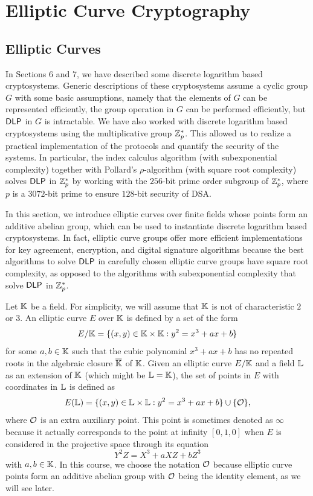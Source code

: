 \section{Elliptic Curve Cryptography}

\subsection{Elliptic Curves}
In Sections 6 and 7, we have described some discrete logarithm based cryptosystems.
Generic descriptions of these cryptosystems assume a cyclic group $G$ with some 
basic assumptions, namely that the elements of $G$ can be represented efficiently,
the group operation in $G$ can be performed efficiently, but ${\sf DLP}$ in $G$ is 
intractable. We have also worked with discrete logarithm based cryptosystems 
using the multiplicative group $\mathbb{Z}_p^*$. This allowed us to realize a 
practical implementation of the protocols and quantify the security of the 
systems. In particular, the index calculus algorithm (with subexponential
complexity) together with Pollard's $\rho$-algorithm (with square root 
complexity) solves ${\sf DLP}$ in $\mathbb{Z}_p^*$ by working with the $256$-bit prime 
order subgroup of $\mathbb{Z}_p^*$, where $p$ is a $3072$-bit prime to ensure 
$128$-bit security of DSA. 

In this section, we introduce elliptic curves over finite fields whose points 
form an additive abelian group, which can be used to instantiate discrete 
logarithm based cryptosystems. In fact, elliptic curve groups offer more 
efficient implementations for key agreement, encryption, and digital signature 
algorithms because the best algorithms to solve ${\sf DLP}$ in carefully chosen 
elliptic curve groups have square root complexity, as opposed to the algorithms 
with subexponential complexity that solve ${\sf DLP}$ in $\mathbb{Z}_p^*$. 

Let $\mathbb{K}$ be a field. For simplicity, we will assume that $\mathbb{K}$ is not of 
characteristic $2$ or $3$. An elliptic curve $E$ over $\mathbb{K}$ is defined by 
a set of the form 
\[ E/\mathbb{K} = \{(x, y) \in \mathbb{K} \times \mathbb{K} : y^2 = x^3 + ax + b\} \] 
for some $a, b \in \mathbb{K}$ such that the cubic polynomial $x^3 + ax + b$
has no repeated roots in the algebraic closure $\overline{\mathbb{K}}$ of $\mathbb{K}$.
Given an elliptic curve $E/\mathbb{K}$ and a field $\mathbb{L}$ as an extension of $\mathbb{K}$
(which might be $\mathbb{L} = \mathbb{K}$), the set of points in $E$ with coordinates 
in $\mathbb{L}$ is defined as 
\[ E(\mathbb{L}) = \{(x, y) \in \mathbb{L} \times \mathbb{L} : y^2 = x^3 + ax + b\} \cup \{\cal O\}, \] 
where ${\cal O}$ is an extra auxiliary point. This point is sometimes 
denoted as $\infty$ because it actually corresponds to the point at infinity 
$[0, 1, 0]$ when $E$ is considered in the projective space through its equation 
\[ Y^2 Z = X^3 + aXZ + bZ^3 \] 
with $a, b \in \mathbb{K}$. In this course, we choose the notation ${\cal O}$ because 
elliptic curve points form an additive abelian group with ${\cal O}$ 
being the identity element, as we will see later. 


